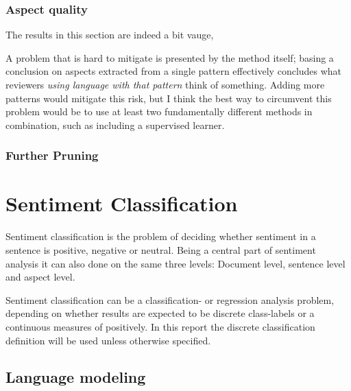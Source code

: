 \documentclass[a4paper,11pt]{kth-mag}
\begin{document}
\subsection{Aspect quality}
The results in this section are indeed a bit vauge, %


A problem that is hard to mitigate is presented by the method itself;
basing a conclusion on aspects extracted from a single pattern effectively concludes
what reviewers \emph{using language with that pattern} think of something.
Adding more patterns would mitigate this risk, but I think the best way to
circumvent this problem would be to use at least two fundamentally different
methods in combination, such as including a supervised learner.


\subsection{Further Pruning}
\label{subsec:suggested_pruing}







\chapter{Sentiment Classification}
Sentiment classification is the problem of deciding whether sentiment in a sentence is positive, negative or neutral\cite{nlp_book}. Being a central part of sentiment analysis it can also done on the same three levels: Document level, sentence level and aspect level.

Sentiment classification can be a classification- or regression analysis problem\cite{liu2012sentiment}, depending on whether results are expected to be discrete class-labels or a continuous measures of positively. In this report the discrete classification definition will be used unless otherwise specified.

\section{Language modeling}
\end{document}
